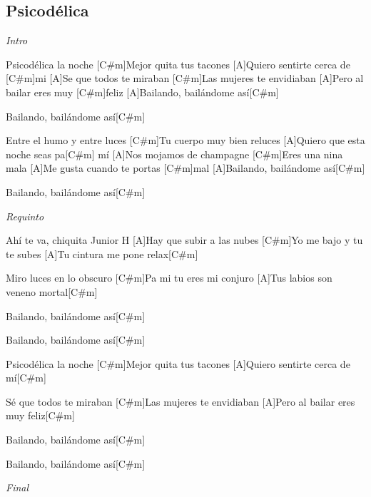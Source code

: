 \subsection{Psicod\'elica}

\noindent
\vspace{1cm}

\begin{guitar}
	\begin{multicols}{2}
		\textit{Intro} \par
		[A]Psicodélica la noche
		[C#m]Mejor quita tus tacones
		[A]Quiero sentirte cerca de [C#m]mi
		[A]Se que todos te miraban
		[C#m]Las mujeres te envidiaban
		[A]Pero al bailar eres muy [C#m]feliz
		[A]Bailando, bailándome así[C#m] \par
		[A]Bailando, bailándome así[C#m] \par
		[A]Entre el humo y entre luces
		[C#m]Tu cuerpo muy bien reluces
		[A]Quiero que esta noche seas pa[C#m] mí
		[A]Nos mojamos de champagne
		[C#m]Eres una nina mala
		[A]Me gusta cuando te portas [C#m]mal
		[A]Bailando, bailándome así[C#m] \par
		[Bm]Bailando, bailándome así[C#m] \par
		\par
		\textit{Requinto}

		Ahí te va, chiquita
		Junior H
		[A]Hay que subir a las nubes
		[C#m]Yo me bajo y tu te subes
		[A]Tu cintura me pone relax[C#m] \par
		[A]Miro luces en lo obscuro
		[C#m]Pa mi tu eres mi conjuro
		[A]Tus labios son veneno mortal[C#m] \par
		[A]Bailando, bailándome así[C#m] \par
		[A]Bailando, bailándome así[C#m] \par
		[A]Psicodélica la noche
		[C#m]Mejor quita tus tacones
		[A]Quiero sentirte cerca de mí[C#m] \par
		[A]Sé que todos te miraban
		[C#m]Las mujeres te envidiaban
		[A]Pero al bailar eres muy feliz[C#m] \par
		[A]Bailando, bailándome así[C#m] \par
		[A]Bailando, bailándome así[C#m] \par
		\par
		\textit{Final}
	\end{multicols}
\end{guitar}
